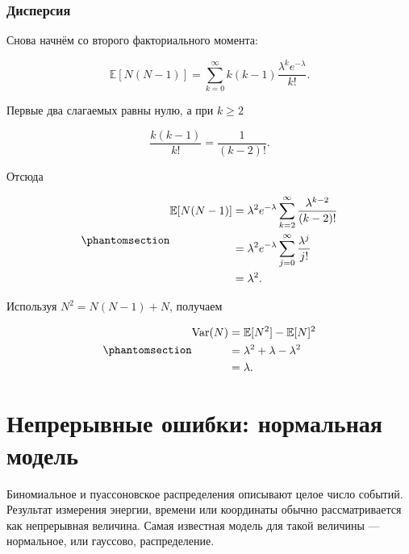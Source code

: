 \documentclass[
  russian,
  11pt,
  a4paper,
  open=any]{scrbook}
\begin{document}
\begin{bookderivation}

\subsubsection{Дисперсия}\label{ux434ux438ux441ux43fux435ux440ux441ux438ux44f-2}

Снова начнём со второго факториального момента:

\[
\mathbb E[N(N-1)]
=\sum_{k=0}^{\infty}
k(k-1)\frac{\lambda^k e^{-\lambda}}{k!}.
\]

Первые два слагаемых равны нулю, а при \(k\geq2\)

\[
\frac{k(k-1)}{k!}=\frac{1}{(k-2)!}.
\]

Отсюда

\begin{equation}\protect\phantomsection\label{eq-poisson-second-factorial-moment}{
\begin{aligned}
\mathbb E[N(N-1)]
&=\lambda^2e^{-\lambda}
\sum_{k=2}^{\infty}\frac{\lambda^{k-2}}{(k-2)!}\\
&=\lambda^2e^{-\lambda}
\sum_{j=0}^{\infty}\frac{\lambda^j}{j!}\\
&=\lambda^2.
\end{aligned}
}\end{equation}

Используя \(N^2=N(N-1)+N\), получаем

\begin{equation}\protect\phantomsection\label{eq-poisson-variance}{
\begin{aligned}
\operatorname{Var}(N)
&=\mathbb E[N^2]-\mathbb E[N]^2\\
&=\lambda^2+\lambda-\lambda^2\\
&=\lambda.
\end{aligned}
}\end{equation}

\end{bookderivation}

\section{Непрерывные ошибки: нормальная
модель}\label{ux43dux435ux43fux440ux435ux440ux44bux432ux43dux44bux435-ux43eux448ux438ux431ux43aux438-ux43dux43eux440ux43cux430ux43bux44cux43dux430ux44f-ux43cux43eux434ux435ux43bux44c}

Биномиальное и пуассоновское распределения описывают целое число
событий. Результат измерения энергии, времени или координаты обычно
рассматривается как непрерывная величина. Самая известная модель для
такой величины --- нормальное, или гауссово, распределение.
\end{document}
